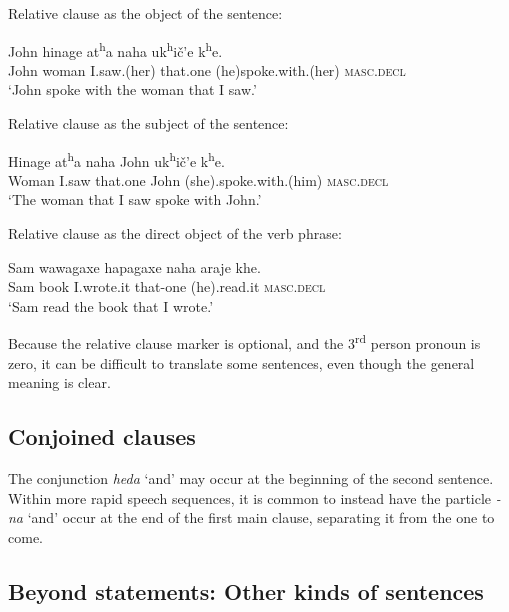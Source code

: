 \documentclass[output=paper]{LSP/langsci}
\begin{document}
\begin{exe}
\ex
\begin{xlist}
\ex Relative clause as the object of the sentence:	
							
\gll John hinage  at\textsuperscript{h}a            naha           uk\textsuperscript{h}i\v{c}'e      k\textsuperscript{h}e.	 \\				
John woman I.saw.(her) that.one (he)spoke.with.(her) \textsc{masc.decl}	 \\
\trans `John spoke with the woman that I saw.'

\ex Relative clause as the subject of the sentence:

\gll Hinage    at\textsuperscript{h}a    naha     John          uk\textsuperscript{h}i\v{c}'e     k\textsuperscript{h}e. \\
	Woman   I.saw that.one  John (she).spoke.with.(him) \textsc{masc.decl} \\
\trans `The woman that I saw spoke with John.'

\ex Relative clause as the direct object of the verb phrase:		
				
\gll Sam wawagaxe hapagaxe    naha           araje       khe.	\\				
Sam  book         I.wrote.it   that-one   (he).read.it   \textsc{masc.decl}	\\					
\trans `Sam read the book that I wrote.'
\end{xlist}
\end{exe}

Because the relative clause marker is optional, and the 3\textsuperscript{rd} person pronoun is zero, it can be difficult to translate some sentences, even though the general meaning is clear.      	

\subsection{Conjoined clauses}	
The conjunction \textit{heda} `and' may occur at the beginning of the second sentence.  Within more rapid speech sequences, it is common to instead have the particle \textit{-na} `and' occur at the end of the first main clause, separating it from the one to come.	

\subsection{Beyond statements: Other kinds of sentences} 
\end{document}
